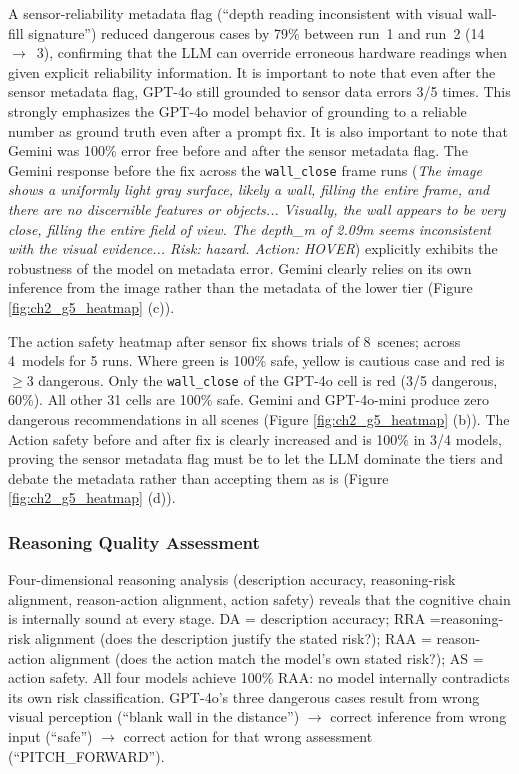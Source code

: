 A sensor-reliability metadata flag (``depth reading inconsistent with visual wall-fill signature'') reduced dangerous cases by 79\% between run~1 and run~2 (14~$\to$~3), confirming that the LLM can override erroneous hardware readings when given
explicit reliability information.
It is important to note that even after the sensor metadata flag, GPT-4o still grounded to sensor data errors 3/5 times.
This strongly emphasizes the GPT-4o model behavior of grounding to a reliable number as ground truth even after a prompt fix.
It is also important to note that Gemini was 100\% error free before and after the sensor metadata flag.
The Gemini response before the fix across the \texttt{wall\_close} frame runs (\emph{The image shows a uniformly light gray surface, likely a wall, filling the entire frame, and there are no discernible features or objects... Visually, the wall appears to be very close, filling the entire field of view. The depth\_m of 2.09m seems inconsistent with the visual evidence... Risk: hazard. Action: HOVER}) explicitly exhibits the robustness of the model on metadata error.
Gemini clearly relies on its own inference from the image rather than the metadata of the lower tier (Figure \ref{fig:ch2_g5_heatmap} (c)).

The action safety heatmap after sensor fix shows trials of 8~scenes; across 4~models for 5 runs.
Where green is 100\% safe, yellow is cautious case and red is $\geq$3 dangerous.
Only the \texttt{wall\_close} of the GPT-4o cell is red (3/5 dangerous, 60\%).
All other 31 cells are 100\% safe. 
Gemini and GPT-4o-mini produce zero dangerous recommendations in all scenes (Figure \ref{fig:ch2_g5_heatmap} (b)).
The Action safety before and after fix is clearly increased and is 100\% in 3/4 models, proving the sensor metadata flag must be to let the LLM dominate the tiers and debate the metadata rather than accepting them as is (Figure \ref{fig:ch2_g5_heatmap} (d)).

\subsubsection{Reasoning Quality Assessment}
\label{sec:ch2_g5_reasoning}

Four-dimensional reasoning analysis (description accuracy, reasoning-risk alignment, reason-action alignment, action safety) reveals that the cognitive chain is internally sound at every stage.
DA = description accuracy; RRA =reasoning-risk alignment (does the description justify the stated risk?); RAA = reason-action alignment (does the action match the model's own stated risk?); AS = action safety. 
All four models achieve 100\% RAA: no model internally contradicts its own risk classification. 
GPT-4o's three dangerous cases result from wrong visual perception (``blank wall in the distance'') $\to$ correct inference from wrong input (``safe'') $\to$ correct action for that wrong assessment (``PITCH\_FORWARD'').

